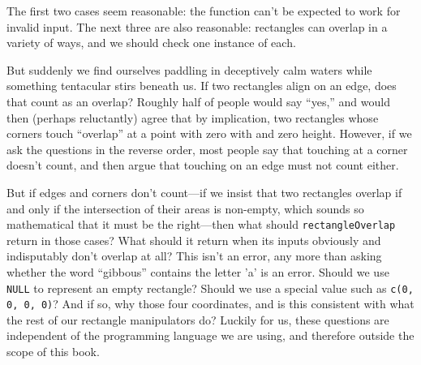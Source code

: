 The first two cases seem reasonable:
the function can't be expected to work for invalid input.
The next three are also reasonable:
rectangles can overlap in a variety of ways,
and we should check one instance of each.

But suddenly we find ourselves paddling in deceptively calm waters
while something tentacular stirs beneath us.
If two rectangles align on an edge, does that count as an overlap?
Roughly half of people would say ``yes,''
and would then (perhaps reluctantly) agree that by implication,
two rectangles whose corners touch ``overlap'' at a point with zero with and zero height.
However,
if we ask the questions in the reverse order,
most people say that touching at a corner doesn't count,
and then argue that touching on an edge must not count either.

But if edges and corners don't count---if we insist that two rectangles overlap
if and only if the intersection of their areas is non-empty,
which sounds so mathematical that it must be the right---then
what should \texttt{rectangleOverlap} return in those cases?
What should it return when its inputs obviously and indisputably don't overlap at all?
This isn't an error,
any more than asking whether the word ``gibbous'' contains the letter 'a' is an error.
Should we use \texttt{NULL} to represent an empty rectangle?
Should we use a special value such as \texttt{c(0, 0, 0, 0)}?
And if so,
why those four coordinates,
and is this consistent with what the rest of our rectangle manipulators do?
Luckily for us,
these questions are independent of the programming language we are using,
and therefore outside the scope of this book.
